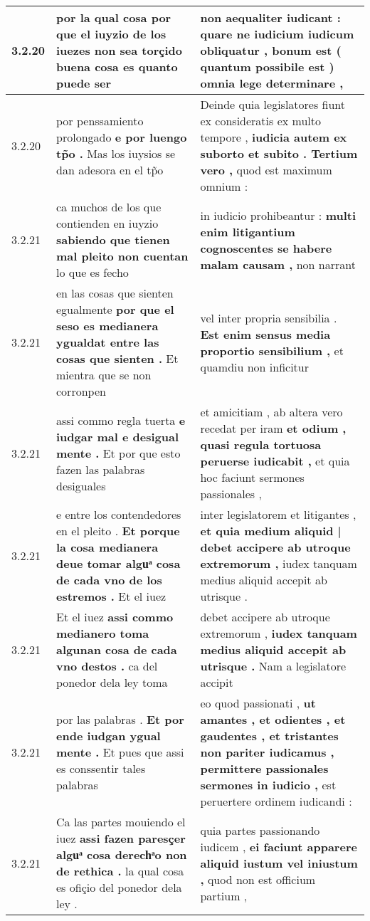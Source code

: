 \begin{tabular}{|p{1cm}|p{6.5cm}|p{6.5cm}|}
3.2.20 & por la qual cosa \textbf{ por que el iuyzio de los iuezes non sea torçido buena cosa es } quanto puede ser & non aequaliter iudicant : \textbf{ quare ne iudicium iudicum obliquatur , bonum est } ( quantum possibile est ) omnia lege determinare , \\\hline
3.2.20 & por penssamiento prolongado \textbf{ e por luengo tp̃o . } Mas los iuysios se dan adesora en el tp̃o & Deinde quia legislatores fiunt ex consideratis ex multo tempore , \textbf{ iudicia autem ex suborto et subito . Tertium vero , } quod est maximum omnium : \\\hline
3.2.21 & ca muchos de los que contienden en iuyzio \textbf{ sabiendo que tienen mal pleito non cuentan } lo que es fecho & in iudicio prohibeantur : \textbf{ multi enim litigantium cognoscentes se habere malam causam , } non narrant \\\hline
3.2.21 & en las cosas que sienten egualmente \textbf{ por que el seso es medianera ygualdat entre las cosas que sienten . } Et mientra que se non corronpen & vel inter propria sensibilia . \textbf{ Est enim sensus media proportio sensibilium , } et quamdiu non inficitur \\\hline
3.2.21 & assi commo regla tuerta \textbf{ e iudgar mal e desigual mente . } Et por que esto fazen las palabras desiguales & et amicitiam , ab altera vero recedat per iram \textbf{ et odium , quasi regula tortuosa peruerse iudicabit , } et quia hoc faciunt sermones passionales , \\\hline
3.2.21 & e entre los contendedores en el pleito . \textbf{ Et porque la cosa medianera deue tomar alguͣ cosa de cada vno de los estremos . } Et el iuez & inter legislatorem et litigantes , \textbf{ et quia medium aliquid | debet accipere ab utroque extremorum , } iudex tanquam medius aliquid accepit ab utrisque . \\\hline
3.2.21 & Et el iuez \textbf{ assi commo medianero toma algunan cosa de cada vno destos . } ca del ponedor dela ley toma & debet accipere ab utroque extremorum , \textbf{ iudex tanquam medius aliquid accepit ab utrisque . } Nam a legislatore accipit \\\hline
3.2.21 & por las palabras . \textbf{ Et por ende iudgan ygual mente . } Et pues que assi es conssentir tales palabras & eo quod passionati , \textbf{ ut amantes , et odientes , et gaudentes , et tristantes non pariter iudicamus , permittere passionales sermones in iudicio , } est peruertere ordinem iudicandi : \\\hline
3.2.21 & Ca las partes mouiendo el iuez \textbf{ assi fazen paresçer alguͣ cosa derechͣo non de rethica . } la qual cosa es ofiçio del ponedor dela ley . & quia partes passionando iudicem , \textbf{ ei faciunt apparere aliquid iustum vel iniustum , } quod non est officium partium , \\\hline

\end{tabular}

